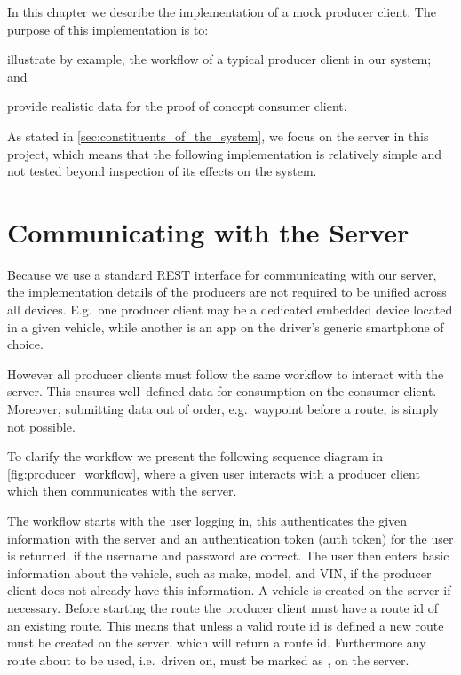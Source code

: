 In this chapter we describe the implementation of a mock producer client.
The purpose of this implementation is to:
\begin{enumberate*}
\item illustrate by example, the workflow of a typical producer client in our system; and
\item provide realistic data for the proof of concept consumer client.
\end{enumberate*}

As stated in \cref{sec:constituents_of_the_system}, we focus on the server in this project,
which means that the following implementation is relatively simple and not tested beyond inspection of its effects on the system.

\section{Communicating with the Server}
Because we use a standard REST interface for communicating with our server, the implementation details of the producers are not required to be unified across all devices.
E.g.~one producer client may be a dedicated embedded device located in a given vehicle, while another is an app on the driver's generic smartphone of choice.

However all producer clients must follow the same workflow to interact with the server.
This ensures well--defined data for consumption on the consumer client. %
Moreover, submitting data out of order, e.g.~waypoint before a route, is simply not possible.

\bigskip
To clarify the workflow we present the following sequence diagram in \cref{fig:producer_workflow},
where a given user interacts with a producer client which then communicates with the server.

The workflow starts with the user logging in, this authenticates the given information with the server and an authentication token (auth token) for the user is returned, if the username and password are correct.
The user then enters basic information about the vehicle, such as make, model, and VIN, if the producer client does not already have this information.
A vehicle is created on the server if necessary.
Before starting the route the producer client must have a route id of an existing route.
This means that unless a valid route id is defined a new route must be created on the server, which will return a route id.
Furthermore any route about to be used, i.e.~driven on, must be marked as , on the server.

